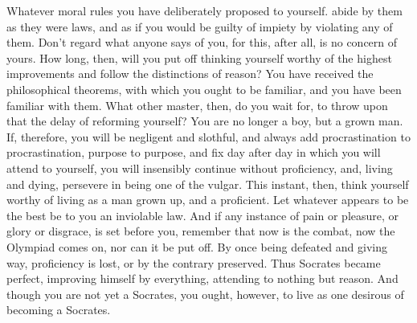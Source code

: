 Whatever moral rules you have deliberately  proposed to yourself. abide by them
as they were laws, and as if you would be guilty of impiety by violating any of
them. Don't regard what anyone says of  you, for this, after all, is no concern
of yours.  How long,  then, will you  put off thinking  yourself worthy  of the
highest improvements and  follow the distinctions of reason?  You have received
the philosophical theorems,  with which you ought to be  familiar, and you have
been familiar  with them. What  other master, then, do  you wait for,  to throw
upon that the delay of reforming yourself? You are no longer a boy, but a grown
man.  If,  therefore, you  will  be  negligent  and  slothful, and  always  add
procrastination to procrastination,  purpose to purpose, and fix  day after day
in which  you will  attend to  yourself, you  will insensibly  continue without
proficiency, and, living and dying, persevere  in being one of the vulgar. This
instant,  then, think  yourself worthy  of  living as  a  man grown  up, and  a
proficient. Let whatever  appears to be the  best be to you  an inviolable law.
And if any  instance of pain or  pleasure, or glory or disgrace,  is set before
you, remember that now is the combat, now  the Olympiad comes on, nor can it be
put off.  By once  being defeated and  giving way, proficiency  is lost,  or by
the  contrary preserved.  Thus Socrates  became perfect,  improving himself  by
everything,  attending to  nothing but  reason. And  though you  are not  yet a
Socrates, you ought, however, to live as one desirous of becoming a Socrates.
